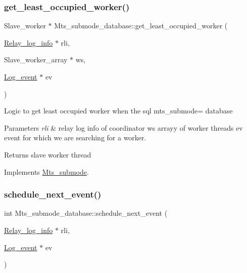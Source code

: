 \subsubsection{\texorpdfstring{get\+\_\+least\+\_\+occupied\+\_\+worker()}{get\_least\_occupied\_worker()}}
{\footnotesize\ttfamily Slave\+\_\+worker $\ast$ Mts\+\_\+submode\+\_\+database\+::get\+\_\+least\+\_\+occupied\+\_\+worker (\begin{DoxyParamCaption}\item[{\mbox{\hyperlink{classRelay__log__info}{Relay\+\_\+log\+\_\+info}} $\ast$}]{rli,  }\item[{Slave\+\_\+worker\+\_\+array $\ast$}]{ws,  }\item[{\mbox{\hyperlink{classLog__event}{Log\+\_\+event}} $\ast$}]{ev }\end{DoxyParamCaption})\hspace{0.3cm}{\ttfamily [virtual]}}

Logic to get least occupied worker when the sql mts\+\_\+submode= database 
\begin{DoxyParams}{Parameters}
{\em rli} & relay log info of coordinator ws arrayy of worker threads ev event for which we are searching for a worker. \\
\hline
\end{DoxyParams}
\begin{DoxyReturn}{Returns}
slave worker thread 
\end{DoxyReturn}


Implements \mbox{\hyperlink{classMts__submode}{Mts\+\_\+submode}}.

\mbox{\label{classMts__submode__database_afcfa7b9bb57cc0fc5851c5882aec84ba}} 
\subsubsection{\texorpdfstring{schedule\+\_\+next\+\_\+event()}{schedule\_next\_event()}}
{\footnotesize\ttfamily int Mts\+\_\+submode\+\_\+database\+::schedule\+\_\+next\+\_\+event (\begin{DoxyParamCaption}\item[{\mbox{\hyperlink{classRelay__log__info}{Relay\+\_\+log\+\_\+info}} $\ast$}]{rli,  }\item[{\mbox{\hyperlink{classLog__event}{Log\+\_\+event}} $\ast$}]{ev }\end{DoxyParamCaption})\hspace{0.3cm}{\ttfamily [virtual]}}


